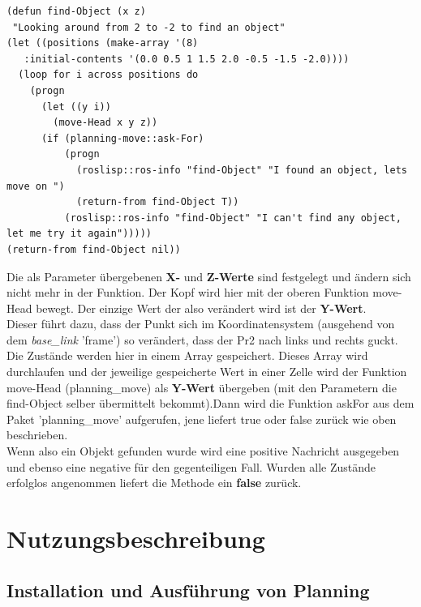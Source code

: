 \documentclass{suturo}
\begin{document}
\noindent
\begin{minipage}{\linewidth}
\begin{lstlisting}
(defun find-Object (x z)
 "Looking around from 2 to -2 to find an object"
(let ((positions (make-array '(8) 
   :initial-contents '(0.0 0.5 1 1.5 2.0 -0.5 -1.5 -2.0))))
  (loop for i across positions do
    (progn
      (let ((y i))
        (move-Head x y z))
      (if (planning-move::ask-For)
          (progn
            (roslisp::ros-info "find-Object" "I found an object, lets move on ")
            (return-from find-Object T))
          (roslisp::ros-info "find-Object" "I can't find any object, let me try it again")))))
(return-from find-Object nil))
\end{lstlisting}
\end{minipage}

 Die als Parameter übergebenen \textbf{X-} und \textbf{Z-Werte} sind festgelegt und ändern sich nicht mehr in der Funktion. Der Kopf wird hier mit der oberen Funktion move-Head bewegt. Der einzige Wert der also verändert wird ist der \textbf{Y-Wert}.\\

 Dieser führt dazu, dass der Punkt sich im Koordinatensystem (ausgehend von dem \textit{base\_link} 'frame') so verändert, dass der Pr2 nach links und rechts guckt. Die Zustände werden hier in einem Array gespeichert. Dieses Array wird durchlaufen und der jeweilige gespeicherte Wert in einer Zelle wird der Funktion move-Head (planning\_move) als \textbf{Y-Wert} übergeben (mit den Parametern die find-Object selber übermittelt bekommt).Dann wird die Funktion askFor aus dem Paket 'planning\_move' aufgerufen, jene liefert true oder false zurück wie oben beschrieben.\\
 
 Wenn also ein Objekt gefunden wurde wird eine positive Nachricht ausgegeben und ebenso eine negative für den gegenteiligen Fall.
  Wurden alle Zustände erfolglos angenommen liefert die Methode ein \textbf{false} zurück.
  

\section{Nutzungsbeschreibung}

\subsection{Installation und Ausführung von Planning}
\end{document}
